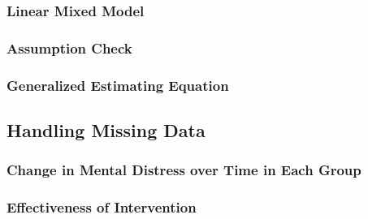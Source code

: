 \subsubsection{Linear Mixed Model}

\subsubsection{Assumption Check}

\subsubsection{Generalized Estimating Equation}

\subsection{Handling Missing Data}

\subsubsection{Change in Mental Distress over Time in Each Group}

\subsubsection{Effectiveness of Intervention}
